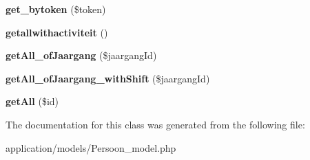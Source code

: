 \begin{DoxyCompactItemize}
{\bfseries get\+\_\+bytoken} (\$token)
\item 
\mbox{\label{class_persoon__model_a20a10592218dbf11fd43c955ce5fcee1}} 
{\bfseries getallwithactiviteit} ()
\item 
\mbox{\label{class_persoon__model_aba5a7a9b6a803620d0fddcbfffa83148}} 
{\bfseries get\+All\+\_\+of\+Jaargang} (\$jaargang\+Id)
\item 
\mbox{\label{class_persoon__model_afa062e8195502a034cfa2780c6763cf6}} 
{\bfseries get\+All\+\_\+of\+Jaargang\+\_\+with\+Shift} (\$jaargang\+Id)
\item 
\mbox{\label{class_persoon__model_a9169319ec748964dc67f0f640d182250}} 
{\bfseries get\+All} (\$id)
\end{DoxyCompactItemize}


The documentation for this class was generated from the following file\+:\begin{DoxyCompactItemize}
\item 
application/models/Persoon\+\_\+model.\+php\end{DoxyCompactItemize}
